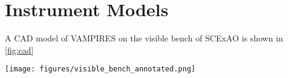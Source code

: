 \section{Instrument Models\label{sec:models}}

A CAD model of VAMPIRES on the visible bench of SCExAO is shown in \autoref{fig:cad}


\begin{figure*}
    \centering
    \texttt{[image: figures/visible\_bench\_annotated.png]}
    \caption{SCExAO visible bench including the PyWFS, FIRST injection, and VAMPIRES. VAMPIRES optics are labeled in orange and FIRST/PyWFS optics are labeled in red. The total size of the optical table shown is \SI{120}{\cm} by \SI{90}{\cm}.\label{fig:cad}}
\end{figure*}
